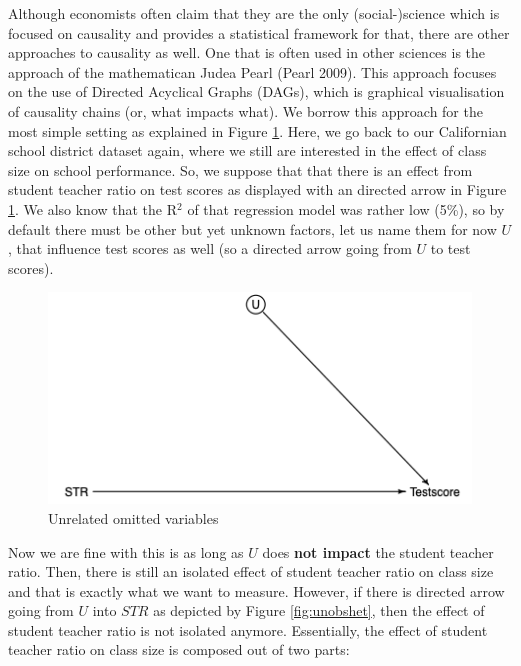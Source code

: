 \documentclass[
]{book}
\begin{document}
Although economists often claim that they are the only (social-)science which is focused on causality and provides a statistical framework for that, there are other approaches to causality as well. One that is often used in other sciences is the approach of the mathematican Judea Pearl (Pearl 2009). This approach focuses on the use of Directed Acyclical Graphs (DAGs), which is graphical visualisation of causality chains (or, what impacts what). We borrow this approach for the most simple setting as explained in Figure \ref{fig:unknown}. Here, we go back to our Californian school district dataset again, where we still are interested in the effect of class size on school performance. So, we suppose that that there is an effect from student teacher ratio on test scores as displayed with an directed arrow in Figure \ref{fig:unknown}. We also know that the R\(^2\) of that regression model was rather low (5\%), so by default there must be other but yet unknown factors, let us name them for now \(U\), that influence test scores as well (so a directed arrow going from \(U\) to test scores).

\begin{figure}

{\centering \includegraphics[width=600px]{./figures/unknown} 

}

\caption{Unrelated omitted variables}\label{fig:unknown}
\end{figure}

Now we are fine with this is as long as \(U\) does \textbf{not impact} the student teacher ratio. Then, there is still an isolated effect of student teacher ratio on class size and that is exactly what we want to measure. However, if there is directed arrow going from \(U\) into \(STR\) as depicted by Figure \ref{fig:unobshet}, then the effect of student teacher ratio is not isolated anymore. Essentially, the effect of student teacher ratio on class size is composed out of two parts:
\end{document}
